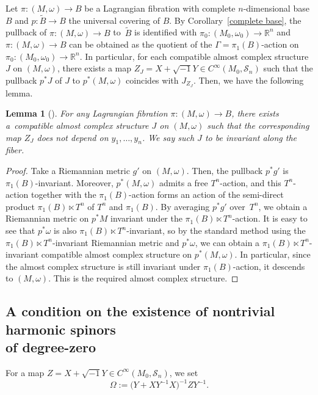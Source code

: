 \documentclass[pdftex]{sigma}
\numberwithin{equation}{section}
\newtheorem{Lemma}[Theorem]{Lemma}
\newcommand{\R}{\mathbb{R}}
\renewcommand{\tilde}{\widetilde}
\begin{document}
Let $\pi\colon (M,\omega)\to B$ be a Lagrangian fibration with complete $n$-dimensional base $B$ and $p\colon \tilde B\to B$ the universal covering of $B$. By Corollary~\ref{complete base}, the pullback of $\pi\colon (M,\omega)\to B$ to~$\tilde B$ is identified with $\pi_0\colon (M_0,\omega_0)\to \R^n$ and $\pi\colon (M,\omega)\to B$ can be obtained as the quotient of the $\Gamma=\pi_1(B)$-action on $\pi_0\colon (M_0,\omega_0)\to \R^n$. In particular, for each compatible almost complex structure $J$ on $(M,\omega)$, there exists a map $Z_J=X+\sqrt{-1}Y\in C^\infty\left(M_0,{\mathcal S}_n\right)$ such that the pullback $p^*J$ of $J$ to $p^*(M,\omega)$ coincides with $J_{Z_J}$. Then, we have the following lemma.
\begin{Lemma}[\textup{\cite[Corollary~9.15]{FFY2}}]\label{invariant J}
For any Lagrangian fibration $\pi\colon (M,\omega)\to B$, there exists a~compatible almost complex structure $J$ on $(M,\omega)$ such that the corresponding map $Z_J$ does not depend on $y_1,\ldots ,y_n$. We say such $J$ to be invariant along the fiber.
\end{Lemma}
\begin{proof}
Take a Riemannian metric $g'$ on $(M,\omega)$. Then, the pullback $p^*g'$ is $\pi_1(B)$-invariant. Moreover, $p^*(M,\omega)$ admits a free $T^n$-action, and this $T^n$-action together with the $\pi_1(B)$-action forms an action of the semi-direct product $\pi_1(B)\ltimes T^n$ of $T^n$ and $\pi_1(B)$. By averaging $p^*g'$ over~$T^n$, we obtain a Riemannian metric on $p^*M$ invariant under the $\pi_1(B)\ltimes T^n$-action. It is easy to see that $p^*\omega$ is also $\pi_1(B)\ltimes T^n$-invariant, so by the standard method using the $\pi_1(B)\ltimes T^n$-invariant Riemannian metric and $p^*\omega$, we can obtain a $\pi_1(B)\ltimes T^n$-invariant compatible almost complex structure on $p^*(M,\omega)$. In particular, since the almost complex structure is still invariant under $\pi_1(B)$-action, it descends to $(M,\omega)$. This is the required almost complex structure.
\end{proof}

\subsection[A condition on the existence of nontrivial harmonic spinors of degree-zero]{A condition on the existence of nontrivial harmonic spinors\\ of degree-zero}
\label{Spin-c Dirac operator}
For a map $Z=X+\sqrt{-1}Y\in C^\infty ( M_0,{\mathcal S}_n)$, we set
\begin{equation}\label{Omega}
\Omega:=\bigl(Y+XY^{-1}X\bigr)^{-1}ZY^{-1}.
\end{equation}
\end{document}
